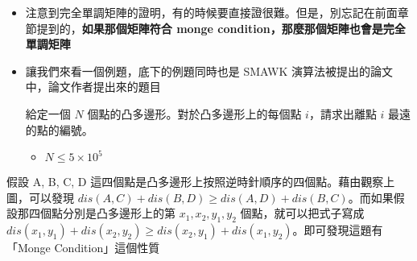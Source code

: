 \documentclass[standalone]{beamer}
\begin{document}
\begin{frame}{}
  \begin{itemize}
    \item 注意到完全單調矩陣的證明，有的時候要直接證很難。但是，別忘記在前面章節提到的，\textbf{如果那個矩陣符合 monge condition，那麼那個矩陣也會是完全單調矩陣}
    \item 讓我們來看一個例題，底下的例題同時也是 SMAWK 演算法被提出的論文中，論文作者提出來的題目
    \begin{problem}
      給定一個 $N$ 個點的凸多邊形。對於凸多邊形上的每個點 $i$，請求出離點 $i$ 最遠的點的編號。

      \begin{itemize}
        \item $N \leq 5 \times 10^5$
      \end{itemize}
    \end{problem}
  \end{itemize}
\end{frame}

\begin{frame}{}

假設 A, B, C, D 這四個點是凸多邊形上按照逆時針順序的四個點。藉由觀察上圖，可以發現 $dis(A, C) + dis(B, D) \geq dis(A, D) + dis(B, C)$。而如果假設那四個點分別是凸多邊形上的第 $x_1, x_2, y_1, y_2$ 個點，就可以把式子寫成 $dis(x_1, y_1) + dis(x_2, y_2) \geq dis(x_2, y_1) + dis(x_1, y_2)$。即可發現這題有「Monge Condition」這個性質
\end{frame}
\end{document}
